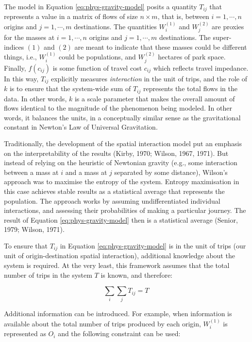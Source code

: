 \documentclass[
11pt, %
oneside, %
english, %
singlespacing, %
]{macthesis} %
\begin{document}
The model in Equation \ref{eq:phys-gravity-model} posits a quantity \(T_{ij}\) that represents a value in a matrix of flows of size \(n \times m\), that is, between \(i = 1,\cdots, n\) origins and \(j = 1,\cdots, m\) destinations. The quantities \(W_i^{(1)}\) and \(W_j^{(2)}\) are proxies for the masses at \(i=1,\cdots,n\) origins and \(j=1,\cdots,m\) destinations. The super-indices \((1)\) and \((2)\) are meant to indicate that these masses could be different things, i.e., \(W_i^{(1)}\) could be populations, and \(W_j^{(2)}\) hectares of park space. Finally, \(f(c_{ij})\) is some function of travel cost \(c_{ij}\) which reflects travel impedance. In this way, \(T_{ij}\) explicitly measures \emph{interaction} in the unit of trips, and the role of \(k\) is to ensure that the system-wide sum of \(T_{ij}\) represents the total flows in the data. In other words, \(k\) is a scale parameter that makes the overall amount of flows identical to the magnitude of the phenomenon being modeled. In other words, it balances the units, in a conceptually similar sense as the gravitational constant in Newton's Law of Universal Gravitation.

Traditionally, the development of the spatial interaction model put an emphasis on the interpretability of the results (Kirby, 1970; Wilson, 1967, 1971). But instead of relying on the heuristic of Newtonian gravity (e.g., some interaction between a mass at \(i\) and a mass at \(j\) separated by some distance), Wilson's approach was to maximise the entropy of the system. Entropy maximisation in this case achieves stable results as a statistical average that represents the population. The approach works by assuming undifferentiated individual interactions, and assessing their probabilities of making a particular journey. The result of Equation \ref{eq:phys-gravity-model} then is a statistical average (Senior, 1979; Wilson, 1971).

To ensure that \(T_{ij}\) in Equation \ref{eq:phys-gravity-model} is in the unit of trips (our unit of origin-destination spatial interaction), additional knowledge about the system is required. At the very least, this framework assumes that the total number of trips in the system \(T\) is known, and therefore:

\begin{equation}
\label{eq:constraint0-gravitymodel}
\sum_i\sum_j T_{ij} = T
\end{equation} 

Additional information can be introduced. For example, when information is available about the total number of trips produced by each origin, \(W_i^{(1)}\) is represented as \(O_i\) and the following constraint can be used:
\end{document}
